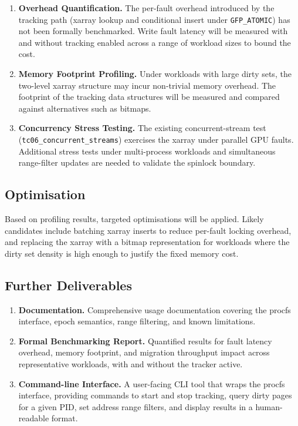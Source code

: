 \begin{enumerate}
    \item \textbf{Overhead Quantification.}
          The per-fault overhead introduced by the tracking path (xarray lookup and conditional
          insert under \texttt{GFP\_ATOMIC}) has not been formally benchmarked. Write fault
          latency will be measured with and without tracking enabled across a range of workload
          sizes to bound the cost.

    \item \textbf{Memory Footprint Profiling.}
          Under workloads with large dirty sets, the two-level xarray structure may incur
          non-trivial memory overhead. The footprint of the tracking data structures will be
          measured and compared against alternatives such as bitmaps.

    \item \textbf{Concurrency Stress Testing.}
          The existing concurrent-stream test (\texttt{tc06\_concurrent\_streams}) exercises
          the xarray under parallel GPU faults. Additional stress tests under multi-process
          workloads and simultaneous range-filter updates are needed to validate the spinlock
          boundary.
\end{enumerate}

\subsection*{Optimisation}

Based on profiling results, targeted optimisations will be applied. Likely candidates include
batching xarray inserts to reduce per-fault locking overhead, and replacing the xarray with a
bitmap representation for workloads where the dirty set density is high enough to justify the
fixed memory cost.

\subsection*{Further Deliverables}

\begin{enumerate}
    \item \textbf{Documentation.}
          Comprehensive usage documentation covering the procfs interface, epoch semantics,
          range filtering, and known limitations.

    \item \textbf{Formal Benchmarking Report.}
          Quantified results for fault latency overhead, memory footprint, and migration
          throughput impact across representative workloads, with and without the tracker active.

    \item \textbf{Command-line Interface.}
          A user-facing CLI tool that wraps the procfs interface, providing commands to start
          and stop tracking, query dirty pages for a given PID, set address range filters, and
          display results in a human-readable format.
\end{enumerate}
